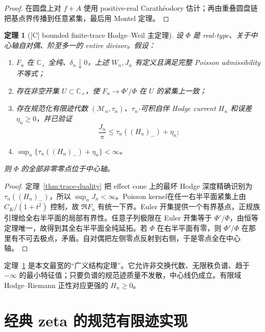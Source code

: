 \documentclass[UTF8,11pt,a4paper]{ctexart}
\newtheorem{theorem}{定理}[section]
\theoremstyle{definition}
\theoremstyle{remark}
\newcommand{\C}{\mathbb C}
\newcommand{\1}{\mathbf 1}
\newcommand{\cM}{\mathcal M}
\newcommand{\statusC}{\textnormal{[C]}}
\begin{document}
\begin{proof}
在圆盘上对 $f+A$ 使用 positive-real Carath\'eodory 估计；再由重叠圆盘链把基点界传播到任意紧集，最后用 Montel 定理。
\end{proof}

\begin{theorem}[\statusC{} bounded finite-trace Hodge--Weil 主定理]\label{thm:main}
设 $\Phi$ 是 real-type、关于中心轴自对偶、阶至多一的 entire divisor。假设：
\begin{enumerate}
 \item $F_n$ 在 $\C_+$ 全纯、$\delta_n\downarrow0$，上述 $W_n,J_n$ 有定义且满足完整 Poisson admissibility 不等式；
 \item 存在非空开集 $U\subset\C_+$，使 $F_n\to\Phi'/\Phi$ 在 $U$ 的紧集上一致；
 \item 存在规范化有限迹代数 $(\cM_n,\tau_n)$、$\tau_n$-可积自伴 Hodge current $H_n$ 和误差 $\eta_n\geq0$，并已验证
 \[
   \frac{J_n}{\pi}\leq\tau_n((H_n)_-)+\eta_n;
 \]
 \item $\sup_n\{\tau_n((H_n)_-)+\eta_n\}<\infty$。
\end{enumerate}
则 $\Phi$ 的全部非零零点位于中心轴。
\end{theorem}

\begin{proof}
定理~\ref{thm:trace-duality} 把 effect cone 上的最坏 Hodge 深度精确识别为 $\tau_n((H_n)_-)$，所以 $\sup_nJ_n<\infty$。Poisson kernel在任一右半平面紧集上由 $C_K/(1+t^2)$ 控制，故 $\Re F_n$ 有统一下界。Euler 开集提供一个有界基点，正规族引理给全右半平面的局部有界性。任意子列极限在 Euler 开集等于 $\Phi'/\Phi$，由恒等定理唯一，故得到其全右半平面全纯延拓。若 $\Phi$ 在右半平面有零，则 $\Phi'/\Phi$ 在那里有不可去极点，矛盾。自对偶把左侧零点反射到右侧，于是零点全在中心轴。
\end{proof}

定理~\ref{thm:main} 是本文最宽的“广义结构定理”。它允许非交换代数、无限秩负谱、趋于 $-\infty$ 的最小特征值；只要负谱的规范迹质量不发散，中心线仍成立。有限域 Hodge--Riemann 正性对应更强的 $H_n\geq0$。

\section{经典 zeta 的规范有限迹实现}
\end{document}
